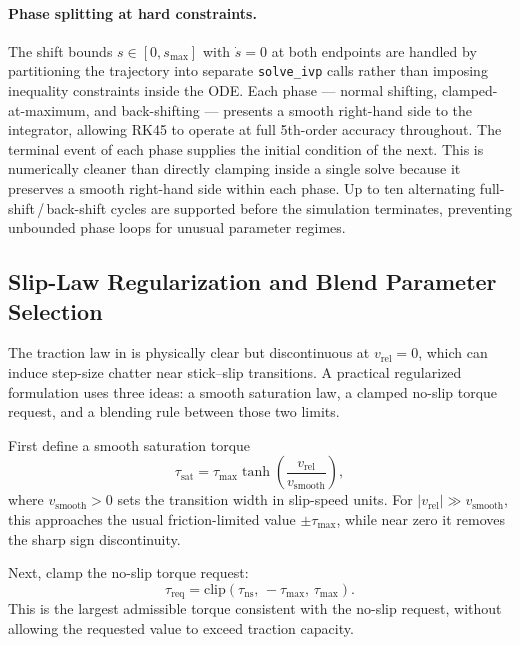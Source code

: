 \documentclass[11pt]{article}
\numberwithin{equation}{section}
\begin{document}
\paragraph{Phase splitting at hard constraints.}

The shift bounds $s \in [0, s_{\max}]$ with $\dot{s} = 0$ at both endpoints
are handled by partitioning the trajectory into separate \texttt{solve\_ivp}
calls rather than imposing inequality constraints inside the ODE. Each phase
--- normal shifting, clamped-at-maximum, and back-shifting --- presents a
smooth right-hand side to the integrator, allowing RK45 to operate at full
5th-order accuracy throughout. The terminal event of each phase supplies the
initial condition of the next. This is numerically cleaner than directly
clamping  inside a single solve because it preserves a
smooth right-hand side within each phase. Up to ten alternating full-shift\,/\,back-shift
cycles are supported before the simulation terminates, preventing unbounded
phase loops for unusual parameter regimes.

\subsection{Slip-Law Regularization and Blend Parameter Selection}
\label{sec:appendix-slip-regularization}

The traction law in  is physically clear but
discontinuous at $v_{\mathrm{rel}}=0$, which can induce step-size chatter near
stick--slip transitions. A practical regularized formulation uses three ideas:
a smooth saturation law, a clamped no-slip torque request, and a blending rule
between those two limits.

First define a smooth saturation torque
\begin{equation}
\tau_{\mathrm{sat}}
=
\tau_{\max}
\tanh\!\left(\frac{v_{\mathrm{rel}}}{v_{\mathrm{smooth}}}\right),
\label{eq:tau_tanh_regularized}
\end{equation}
where $v_{\mathrm{smooth}}>0$ sets the transition width in slip-speed units.
For $|v_{\mathrm{rel}}| \gg v_{\mathrm{smooth}}$, this approaches the usual
friction-limited value $\pm\tau_{\max}$, while near zero it removes the sharp
sign discontinuity.

Next, clamp the no-slip torque request:
\begin{equation}
\tau_{\mathrm{req}}
=
\mathrm{clip}\!\left(\tau_{\mathrm{ns}},\,-\tau_{\max},\,\tau_{\max}\right).
\label{eq:tau_ns_clamped_impl}
\end{equation}
This is the largest admissible torque consistent with the no-slip request,
without allowing the requested value to exceed traction capacity.
\end{document}
